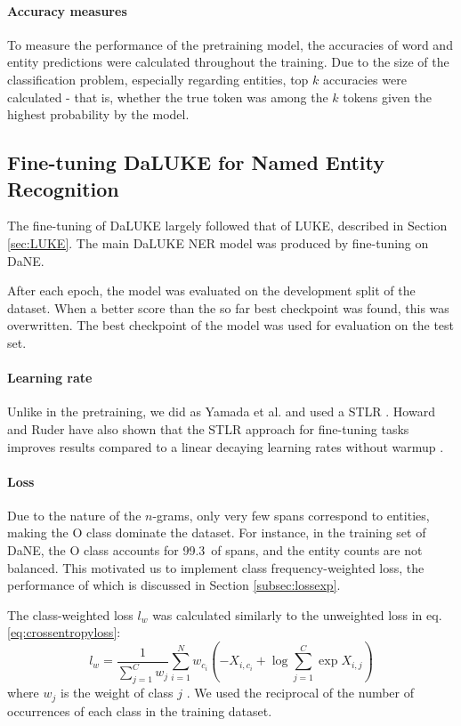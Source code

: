 \documentclass[main.tex]{subfiles}
\begin{document}
\paragraph{Accuracy measures}
To measure the performance of the pretraining model, the accuracies of word and entity predictions were calculated throughout the training.
Due to the size of the classification problem, especially regarding entities, top $ k $ accuracies were calculated - that is, whether the true token was among the $ k $ tokens given the highest probability by the model.

\subsection{Fine-tuning DaLUKE for Named Entity Recognition}%
\label{sub:fine-tune-ner}
The fine-tuning of DaLUKE largely followed that of LUKE, described in Section \ref{sec:LUKE}.
The main DaLUKE NER model was produced by fine-tuning on DaNE.

After each epoch, the model was evaluated on the development split of the dataset.
When a better score than the so far best checkpoint was found, this was overwritten.
The best checkpoint of the model was used for evaluation on the test set.

\paragraph{Learning rate}
Unlike in the pretraining, we did as Yamada et al. and used a STLR \cite{yamada2020luke}.
Howard and Ruder have also shown that the STLR approach for fine-tuning tasks improves results compared to a linear decaying learning rates without warmup \cite{howardruder2018universal}.

\paragraph{Loss}
Due to the nature of the $ n $-grams, only very few spans correspond to entities, making the O class dominate the dataset.
For instance, in the training set of DaNE, the O class accounts for 99.3\pro\ of spans, and the entity counts are not balanced.
This motivated us to implement class frequency-weighted loss, the performance of which is discussed in Section \ref{subsec:lossexp}.

The class-weighted loss $ l_w $ was calculated similarly to the unweighted loss in eq. \eqref{eq:crossentropyloss}:
\begin{equation}\label{eq:w-crossentropyloss}
    l_w = \frac{1}{\sum_{j=1}^{C} w_j}
    \sum_{i=1}^N w_{c_i} \left(
        -X_{i, c_i} + \log \sum_{j=1}^C \exp X_{i, j}
    \right)
\end{equation}
where $ w_j $ is the weight of class $ j $ \cite{pytorchcel}.
We used the reciprocal of the number of occurrences of each class in the training dataset.
\end{document}
